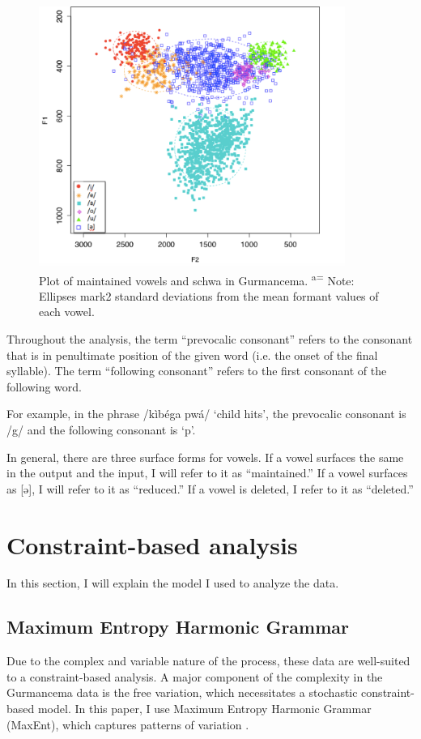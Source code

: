 \documentclass[output=paper,newtxmath,modfonts,nonflat,draftmode]{langsci/langscibook}
\begin{document}
\begin{figure} 
\includegraphics[width=10cm]{figures/ACAL_Vowel_plot.png} %
\caption{Plot of maintained vowels and schwa in Gurmancema. \textsuperscript{a=} Note: Ellipses mark2 standard deviations from the mean formant values of each vowel.}
\end{figure}
 

Throughout the analysis, the term “prevocalic consonant” refers to the consonant that is in penultimate position of the given word (i.e. the onset of the final syllable). The term “following consonant” refers to the first consonant of the following word. 

For example, in the phrase /kìbéga pwá/ `child hits', the prevocalic consonant is /g/ and the following consonant is `p'. 

In general, there are three surface forms for vowels. If a vowel surfaces the same in the output and the input, I will refer to it as ``maintained.'' If a vowel surfaces as [ə], I will refer to it as ``reduced.'' If a vowel is deleted, I refer to it as ``deleted.''

\section{Constraint-based analysis}\label{sec:baird:5}
In this section, I will explain the model I used to analyze the data. 

\subsection{Maximum Entropy Harmonic Grammar}\largerpage

Due to the complex and variable nature of the process, these data are well-suited to a constraint-based analysis. A major component of the complexity in the Gurmancema data is the free variation, which necessitates a stochastic constraint-based model. In this paper, I use Maximum Entropy Harmonic Grammar (MaxEnt), which captures patterns of variation \citep{GoldwaterJohnson2003,HayesWilson2008}. 
	 
\end{document}
